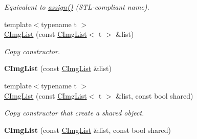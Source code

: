 \begin{DoxyCompactItemize}
\begin{DoxyCompactList}\small\item\em Equivalent to \hyperlink{structcimg__library_1_1_c_img_list_a8531064785b0de93f45d78a42c919765}{assign()} (STL-\/compliant name). \item\end{DoxyCompactList}\item 
\hypertarget{structcimg__library_1_1_c_img_list_a0826aee4aa732c5d293714c8ace2f8fd}{
{\footnotesize template$<$typename t $>$ }\\\hyperlink{structcimg__library_1_1_c_img_list_a0826aee4aa732c5d293714c8ace2f8fd}{CImgList} (const \hyperlink{structcimg__library_1_1_c_img_list}{CImgList}$<$ t $>$ \&list)}
\label{structcimg__library_1_1_c_img_list_a0826aee4aa732c5d293714c8ace2f8fd}

\begin{DoxyCompactList}\small\item\em Copy constructor. \item\end{DoxyCompactList}\item 
\hypertarget{structcimg__library_1_1_c_img_list_a62ae120be1650e651c98eea3335d9978}{
{\bfseries CImgList} (const \hyperlink{structcimg__library_1_1_c_img_list}{CImgList} \&list)}
\label{structcimg__library_1_1_c_img_list_a62ae120be1650e651c98eea3335d9978}

\item 
\hypertarget{structcimg__library_1_1_c_img_list_a29e4b5b0c2ee7c700d12dc61bb288f48}{
{\footnotesize template$<$typename t $>$ }\\\hyperlink{structcimg__library_1_1_c_img_list_a29e4b5b0c2ee7c700d12dc61bb288f48}{CImgList} (const \hyperlink{structcimg__library_1_1_c_img_list}{CImgList}$<$ t $>$ \&list, const bool shared)}
\label{structcimg__library_1_1_c_img_list_a29e4b5b0c2ee7c700d12dc61bb288f48}

\begin{DoxyCompactList}\small\item\em Copy constructor that create a shared object. \item\end{DoxyCompactList}\item 
\hypertarget{structcimg__library_1_1_c_img_list_aef853abbdca79f4c5c516f157aab354a}{
{\bfseries CImgList} (const \hyperlink{structcimg__library_1_1_c_img_list}{CImgList} \&list, const bool shared)}
\label{structcimg__library_1_1_c_img_list_aef853abbdca79f4c5c516f157aab354a}


\end{DoxyCompactItemize}
